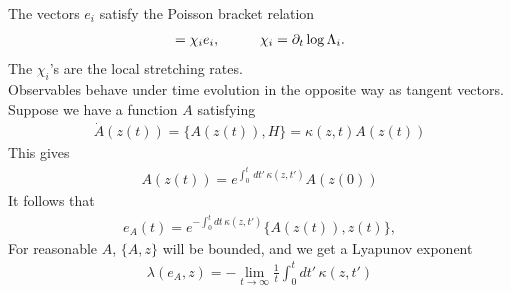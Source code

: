 \documentclass[JHEP,12pt]{article}
\begin{document}
The vectors $e_i$ satisfy the Poisson bracket relation 
\begin{align}
[e_i, F]=\chi_i e_i, \hspace{10 mm}\chi_i=\partial_t \log \Lambda_i.
\end{align}
The $\chi_i$'s are the local stretching rates. \\
\indent Observables behave under time evolution in the opposite way as tangent vectors. Suppose we have a function $A$ satisfying
\begin{align}
\dot{A}(z(t))=\{A(z(t)),H\}=\kappa(z,t) A(z(t))
\end{align}
This gives 
\begin{align}
A(z(t))=e^{\int_{0}^{t}\, dt'\, \kappa(z,t')}A(z(0))
\end{align}
It follows that 
\begin{align}
e_A(t)=e^{-\int_{0}^{t}dt\, \kappa(z,t')}\{A(z(t)),z(t)\},
\end{align}
For reasonable $A$, $\{A,z\}$ will be bounded, and we get a Lyapunov exponent 
\begin{align}
\lambda(e_A,z)=-\lim_{t\to \infty}\frac{1}{t}\int_{0}^{t}dt'\,\kappa(z,t')
\end{align}
\end{document}
